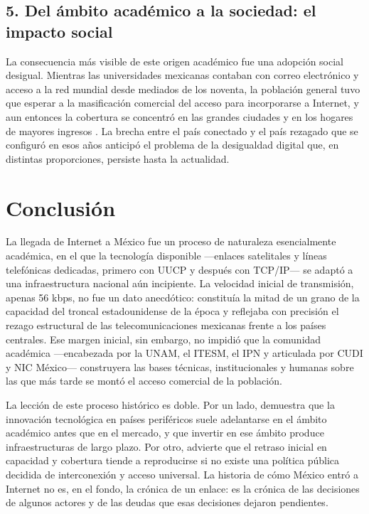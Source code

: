 \documentclass[11pt,a4paper]{article}
\begin{document}
\subsection*{5. Del ámbito académico a la sociedad: el impacto social}

La consecuencia más visible de este origen académico fue una adopción social
desigual. Mientras las universidades mexicanas contaban con correo
electrónico y acceso a la red mundial desde mediados de los noventa, la
población general tuvo que esperar a la masificación comercial del acceso para
incorporarse a Internet, y aun entonces la cobertura se concentró en las
grandes ciudades y en los hogares de mayores ingresos \cite{castells}. La
brecha entre el país conectado y el país rezagado que se configuró en esos
años anticipó el problema de la desigualdad digital que, en distintas
proporciones, persiste hasta la actualidad.

\section*{Conclusión}

La llegada de Internet a México fue un proceso de naturaleza esencialmente
académica, en el que la tecnología disponible —enlaces satelitales y líneas
telefónicas dedicadas, primero con UUCP y después con TCP/IP— se adaptó a una
infraestructura nacional aún incipiente. La velocidad inicial de transmisión,
apenas 56 kbps, no fue un dato anecdótico: constituía la mitad de un grano de
la capacidad del troncal estadounidense de la época y reflejaba con precisión
el rezago estructural de las telecomunicaciones mexicanas frente a los países
centrales. Ese margen inicial, sin embargo, no impidió que la comunidad
académica —encabezada por la UNAM, el ITESM, el IPN y articulada por CUDI y
NIC México— construyera las bases técnicas, institucionales y humanas sobre las
que más tarde se montó el acceso comercial de la población.

La lección de este proceso histórico es doble. Por un lado, demuestra que la
innovación tecnológica en países periféricos suele adelantarse en el ámbito
académico antes que en el mercado, y que invertir en ese ámbito produce
infraestructuras de largo plazo. Por otro, advierte que el retraso inicial en
capacidad y cobertura tiende a reproducirse si no existe una política pública
decidida de interconexión y acceso universal. La historia de cómo México entró
a Internet no es, en el fondo, la crónica de un enlace: es la crónica de las
decisiones de algunos actores y de las deudas que esas decisiones dejaron
pendientes.
\end{document}

